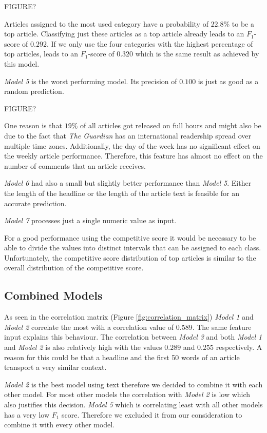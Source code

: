FIGURE?

Articles assigned to the most used category have a probability of $22.8\%$ to be a top article. Classifying just these articles as a top article already leads to an $F_1$-score of $0.292$. If we only use the four categories with the highest percentage of top articles, leads to an $F_1$-score of $0.320$ which is the same result as achieved by this model.


\textit{Model 5} is the worst performing model. Its precision of $0.100$ is just as good as a random prediction.

FIGURE?

One reason is that $19$\% of all articles got released on full hours and might also be due to the fact that \textit{The Guardian} has an international readership spread over multiple time zones. Additionally, the day of the week has no significant effect on the weekly article performance. Therefore, this feature has almost no effect on the number of comments that an article receives. 

\textit{Model 6} had also a small but slightly better performance than \textit{Model 5}. 
Either the length of the headline or the length of the article text is feasible for an accurate prediction.

\textit{Model 7} processes just a single numeric value as input. 

For a good performance using the competitive score it would be necessary to be able to divide the values into distinct intervals that can be assigned to each class.
Unfortunately, the competitive score distribution of top articles is similar to the overall distribution of the competitive score.



\subsection{Combined Models}
As seen in the correlation matrix (Figure \ref{fig:correlation_matrix}) \textit{Model 1} and \textit{Model 2} correlate the most with a correlation value of 0.589. The same feature input explains this behaviour. The correlation between \textit{Model 3} and both \textit{Model 1} and \textit{Model 2} is also relatively high with the values $0.289$ and $0.255$ respectively. A reason for this could be that a headline and the first 50 words of an article transport a very similar context.

\textit{Model 2} is the best model using text therefore we decided to combine it with each other model. For most other models the correlation with \textit{Model 2} is low which also justifies this decision.
\textit{Model 5} which is correlating least with all other models has a very low $F_1$ score. Therefore we excluded it from our consideration to combine it with every other model.

